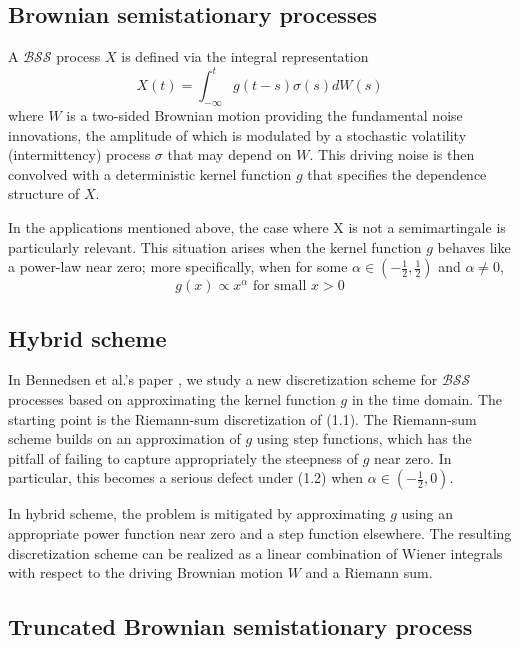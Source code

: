 \documentclass[12pt]{article}
\numberwithin{equation}{section}
\begin{document}
  \subsection{Brownian semistationary processes}

    A $\mathcal{BSS}$ process $X$ is defined via the integral representation
    \begin{equation}
      X(t) = \int_{-\infty}^{t} g(t-s)\sigma(s)dW(s)
    \end{equation}
      where $W$ is a two-sided Brownian motion providing the fundamental noise innovations, the amplitude of which is modulated by a stochastic volatility (intermittency) process $\sigma$ that may depend on $W$. This driving noise is then convolved with a deterministic kernel function $g$ that specifies the dependence structure of $X$.
        
      In the applications mentioned above, the case where X is not a semimartingale is particularly relevant. This situation arises when the kernel function $g$ behaves like a power-law near zero; more specifically, when for some $\alpha \in (-\frac{1}{2}, \frac{1}{2})$ and $\alpha \neq 0$,
    \begin{equation}
      g(x) \propto x^\alpha \text{ for small } x>0
    \end{equation}

  \subsection{Hybrid scheme}
    
    In Bennedsen et al.'s paper \cite{bennedsen2015hybrid}, we study a new discretization scheme for $\mathcal{BSS}$ processes based on approximating the kernel function $g$ in the time domain. The starting point is the Riemann-sum discretization of (1.1). The Riemann-sum scheme builds on an approximation of $g$ using step functions, which has the pitfall of failing to capture appropriately the steepness of $g$ near zero. In particular, this becomes a serious defect under (1.2) when $\alpha \in (-\frac{1}{2}, 0)$. 
    
    In hybrid scheme, the problem is mitigated by approximating $g$ using an appropriate power function near zero and a step function elsewhere. The resulting discretization scheme can be realized as a linear combination of Wiener integrals with respect to the driving Brownian motion $W$ and a Riemann sum.
        
  \subsection{Truncated Brownian semistationary process}
    
\end{document}
